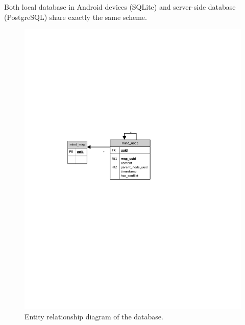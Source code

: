 Both local database in Android devices (SQLite) and server-side database (PostgreSQL) share exactly the same scheme.

\begin{figure}[h]
	\centering
	\includegraphics{graphics-erd}
	\caption{Entity relationship diagram of the database.}
	\label{fig:erd}
\end{figure}
